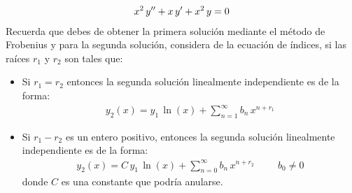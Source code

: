 \begin{enumerate}
\begin{align*}
x^{2} \, {y}^{\prime \prime} + x \, {y}^{\prime} + x^{2} \, y = 0
\end{align*}
Recuerda que debes de obtener la primera solución mediante el método de Frobenius y para la segunda solución, considera de la ecuación de índices, si las raíces $r_{1}$ y $r_{2}$ son tales que:
\begin{itemize}
\item Si $r_{1} = r_{2}$ entonces la segunda solución linealmente independiente es de la forma:
\begin{align*}
y_{2} (x) = y_{1} \, \ln(x) + \sum_{n=1}^{\infty} b_{n} \, x^{n+r_{1}}
\end{align*} 
\item Si $r_{1} - r_{2}$ es un entero positivo, entonces la segunda solución linealmente independiente es de la forma:
\begin{align*}
y_{2} (x) = C \, y_{1} \, \ln(x) + \sum_{n=0}^{\infty} b_{n} \, x^{n+r_{2}} \hspace{1cm} b_{0} \neq 0
\end{align*}
donde $C$ es una constante que podría anularse.
\end{itemize}
\end{enumerate}

